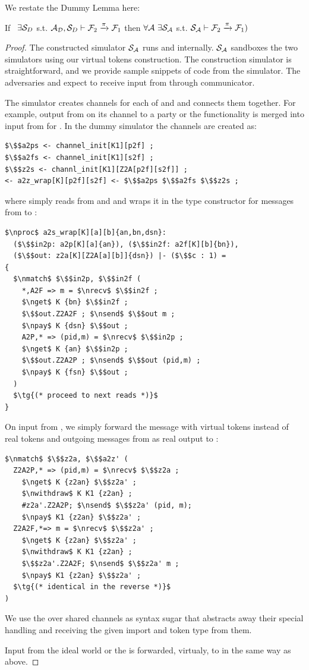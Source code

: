 We restate the Dummy Lemma here:
\begin{theorem}\label{thm:dummy}
If \ $\exists \mathcal{S}_{D}$ s.t. $ \mathcal{A}_\mathcal{D}, \mathcal{S}_{D} \vdash \mathcal{F}_2 \xrightarrow{\pi} \mathcal{F}_1$ then $\forall \mathcal{A} \ \exists \mathcal{S}_\mathcal{A}$ s.t. $\mathcal{S}_{\mathcal{A}} \vdash  \mathcal{F}_2 \xrightarrow{\pi} \mathcal{F}_1)$ 
\end{theorem}

\begin{proof}
The constructed simulator $\mathcal{S}_\mathcal{A}$ runs \A and \DS internally.
$\mathcal{S}_\mathcal{A}$ sandboxes the two simulators using our virtual tokens construction.
The construction simulator is straightforward, and we provide sample snippets of code from the simulator.
The adversaries \A and \DS expect to receive input from \Z through communicator.

The simulator creates channels for each of \A and \DS and connects them together.
For example, output from \A on its channel to a party or the functionality is merged 
into input from \Z for \DS.
In the dummy simulator the channels are created as:
\begin{lstlisting}[basicstyle=\footnotesize\BeraMonottFamily, frame=single,  mathescape]
$\$$a2ps <- channel_init[K1][p2f] ;
$\$$a2fs <- channel_init[K1][s2f] ;
$\$$z2s <- channl_init[K1][Z2A[p2f][s2f]] ;
<- a2z_wrap[K][p2f][s2f] <- $\$$a2ps $\$$a2fs $\$$z2s ;
\end{lstlisting}
where  simply reads from  and  and wraps it in the type constructor for messages from \Z to \A:
\begin{lstlisting}[basicstyle=\footnotesize\BeraMonottFamily, frame=single,  mathescape]
$\nproc$ a2s_wrap[K][a][b]{an,bn,dsn}:
  ($\$$in2p: a2p[K][a]{an}), ($\$$in2f: a2f[K][b]{bn}), 
  ($\$$out: z2a[K][Z2A[a][b]]{dsn}) |- ($\$$c : 1) =
{
  $\nmatch$ $\$$in2p, $\$$in2f (
    *,A2F => m = $\nrecv$ $\$$in2f ; 
	$\nget$ K {bn} $\$$in2f ;
	$\$$out.Z2A2F ; $\nsend$ $\$$out m ;
	$\npay$ K {dsn} $\$$out ;
    A2P,* => (pid,m) = $\nrecv$ $\$$in2p ;
	$\nget$ K {an} $\$$in2p ;
	$\$$out.Z2A2P ; $\nsend$ $\$$out (pid,m) ;
	$\npay$ K {fsn} $\$$out ;
  )
  $\tg{(* proceed to next reads *)}$
}
\end{lstlisting}

On input from \Z, we simply forward the message with virtual tokens instead of real tokens and outgoing messages from \A as real output to \Z:
\begin{lstlisting}[basicstyle=\footnotesize\BeraMonottFamily, frame=single,  mathescape]
$\nmatch$ $\$$z2a, $\$$a2z' (
  Z2A2P,* => (pid,m) = $\nrecv$ $\$$z2a ;
  	$\nget$ K {z2an} $\$$z2a' ;
    $\nwithdraw$ K K1 {z2an} ;
    #z2a'.Z2A2P; $\nsend$ $\$$z2a' (pid, m);
    $\npay$ K1 {z2an} $\$$z2a' ;
  Z2A2F,*=> m = $\nrecv$ $\$$z2a' ;
  	$\nget$ K {z2an} $\$$z2a' ;
    $\nwithdraw$ K K1 {z2an} ;
    $\$$z2a'.Z2A2F; $\nsend$ $\$$z2a' m ;
    $\npay$ K1 {z2an} $\$$z2a' ;
  $\tg{(* identical in the reverse *)}$
)
\end{lstlisting}
We use the  over shared channels as syntax sugar that abstracts away their special handling and receiving the given import and token type from them. 

Input from the ideal world \F or the \partywrapper is forwarded, virtualy, to \DS in the same way as above. 
\end{proof}
